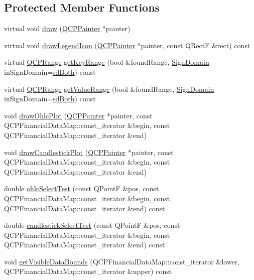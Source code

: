 \subsection*{Protected Member Functions}
\begin{DoxyCompactItemize}
\item 
virtual void \hyperlink{class_q_c_p_financial_ad71a59a1b42616594831e04e52c92120}{draw} (\hyperlink{class_q_c_p_painter}{Q\+C\+P\+Painter} $\ast$painter)
\item 
virtual void \hyperlink{class_q_c_p_financial_aca85e8435b092cc8c3e5de65fcfb22c8}{draw\+Legend\+Icon} (\hyperlink{class_q_c_p_painter}{Q\+C\+P\+Painter} $\ast$painter, const Q\+Rect\+F \&rect) const 
\item 
virtual \hyperlink{class_q_c_p_range}{Q\+C\+P\+Range} \hyperlink{class_q_c_p_financial_acc747f4a9b4fddfb14eb9d803349a534}{get\+Key\+Range} (bool \&found\+Range, \hyperlink{class_q_c_p_abstract_plottable_a661743478a1d3c09d28ec2711d7653d8}{Sign\+Domain} in\+Sign\+Domain=\hyperlink{class_q_c_p_abstract_plottable_a661743478a1d3c09d28ec2711d7653d8a082b98cfb91a7363a3b5cd17b0c1cd60}{sd\+Both}) const 
\item 
virtual \hyperlink{class_q_c_p_range}{Q\+C\+P\+Range} \hyperlink{class_q_c_p_financial_ab2b5f3ef9a503ba32ead32081333f4e7}{get\+Value\+Range} (bool \&found\+Range, \hyperlink{class_q_c_p_abstract_plottable_a661743478a1d3c09d28ec2711d7653d8}{Sign\+Domain} in\+Sign\+Domain=\hyperlink{class_q_c_p_abstract_plottable_a661743478a1d3c09d28ec2711d7653d8a082b98cfb91a7363a3b5cd17b0c1cd60}{sd\+Both}) const 
\item 
void \hyperlink{class_q_c_p_financial_a3c3007a7434e29d042c77ccf4f497e66}{draw\+Ohlc\+Plot} (\hyperlink{class_q_c_p_painter}{Q\+C\+P\+Painter} $\ast$painter, const Q\+C\+P\+Financial\+Data\+Map\+::const\+\_\+iterator \&begin, const Q\+C\+P\+Financial\+Data\+Map\+::const\+\_\+iterator \&end)
\item 
void \hyperlink{class_q_c_p_financial_a71f5081da0e5ab9c40a488ad40cff122}{draw\+Candlestick\+Plot} (\hyperlink{class_q_c_p_painter}{Q\+C\+P\+Painter} $\ast$painter, const Q\+C\+P\+Financial\+Data\+Map\+::const\+\_\+iterator \&begin, const Q\+C\+P\+Financial\+Data\+Map\+::const\+\_\+iterator \&end)
\item 
double \hyperlink{class_q_c_p_financial_a9c7d79351e728a67bfb6821c1d1bd6c0}{ohlc\+Select\+Test} (const Q\+Point\+F \&pos, const Q\+C\+P\+Financial\+Data\+Map\+::const\+\_\+iterator \&begin, const Q\+C\+P\+Financial\+Data\+Map\+::const\+\_\+iterator \&end) const 
\item 
double \hyperlink{class_q_c_p_financial_abd0137244a17d5486a01ee442b083333}{candlestick\+Select\+Test} (const Q\+Point\+F \&pos, const Q\+C\+P\+Financial\+Data\+Map\+::const\+\_\+iterator \&begin, const Q\+C\+P\+Financial\+Data\+Map\+::const\+\_\+iterator \&end) const 
\item 
void \hyperlink{class_q_c_p_financial_aca2edf9f19fae733cdb6bd4549019b84}{get\+Visible\+Data\+Bounds} (Q\+C\+P\+Financial\+Data\+Map\+::const\+\_\+iterator \&lower, Q\+C\+P\+Financial\+Data\+Map\+::const\+\_\+iterator \&upper) const 
\end{DoxyCompactItemize}
